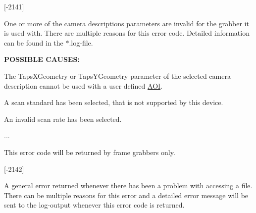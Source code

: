 \begin{Desc}
\begin{description}
{\bfseries }\mbox{[}-\/2141\mbox{]} \item[{\em 
\hypertarget{group___common_interface_gga112225e5fbaaaef6445ff4ebf98f8e03ad6233be0e1bf6428941d2037c1f52e60}{D\+M\+R\+\_\+\+C\+A\+M\+E\+R\+A\+\_\+\+D\+E\+S\+C\+R\+I\+P\+T\+I\+O\+N\+\_\+\+I\+N\+V\+A\+L\+I\+D\+\_\+\+P\+A\+R\+A\+M\+E\+T\+E\+R}\label{group___common_interface_gga112225e5fbaaaef6445ff4ebf98f8e03ad6233be0e1bf6428941d2037c1f52e60}
}]One or more of the camera descriptions parameters are invalid for the grabber it is used with. There are multiple reasons for this error code. Detailed information can be found in the $\ast$.log-\/file.

{\bfseries P\+O\+S\+S\+I\+B\+L\+E C\+A\+U\+S\+E\+S\+:}


\begin{DoxyItemize}
\item The Taps\+X\+Geometry or Taps\+Y\+Geometry parameter of the selected camera description cannot be used with a user defined \hyperlink{struct_a_o_i}{A\+O\+I}.
\item A scan standard has been selected, that is not supported by this device.
\item An invalid scan rate has been selected.
\item ...
\end{DoxyItemize}

This error code will be returned by frame grabbers only.

{\bfseries }\mbox{[}-\/2142\mbox{]} \item[{\em 
\hypertarget{group___common_interface_gga112225e5fbaaaef6445ff4ebf98f8e03aa07319d0a8576389db46e6daf58dfe8f}{D\+M\+R\+\_\+\+F\+I\+L\+E\+\_\+\+A\+C\+C\+E\+S\+S\+\_\+\+E\+R\+R\+O\+R}\label{group___common_interface_gga112225e5fbaaaef6445ff4ebf98f8e03aa07319d0a8576389db46e6daf58dfe8f}
}]A general error returned whenever there has been a problem with accessing a file. There can be multiple reasons for this error and a detailed error message will be sent to the log-\/output whenever this error code is returned.


\end{description}
\end{Desc}
